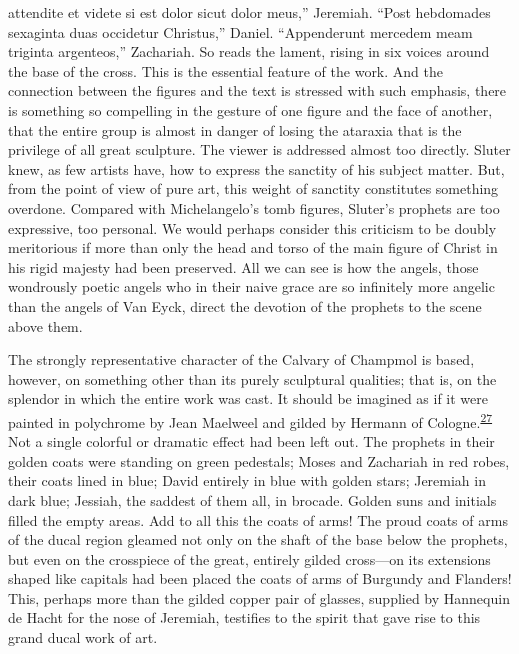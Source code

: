 attendite et videte si est dolor sicut dolor meus,'' Jeremiah. ``Post
hebdomades sexaginta duas occidetur Christus,'' Daniel. ``Appenderunt
mercedem meam triginta argenteos,'' Zachariah. So reads the lament,
rising in six voices around the base of the cross. This is the essential
feature of the work. And the connection between the figures and the text
is stressed with such emphasis, there is something so compelling in the
gesture of one figure and the face of another, that the entire group is
almost in danger of losing the ataraxia that is the privilege of all
great sculpture. The viewer is addressed almost too directly. Sluter
knew, as few artists have, how to express the sanctity of his subject
matter. But, from the point of view of pure art, this weight of sanctity
constitutes something overdone. Compared with Michelangelo's tomb
figures, Sluter's prophets are too expressive, too personal. We would
perhaps consider this criticism to be doubly meritorious if more than
only the head and torso of the main figure of Christ in his rigid
majesty had been preserved. All we can see is how the angels, those
wondrously poetic angels who in their naive grace are so infinitely more
angelic than the angels of Van Eyck, direct the devotion of the prophets
to the scene above them.

The strongly representative character of the Calvary of
Champ\protect\hypertarget{20_ILLUSTRATIONS_FOLLOW_PAGE.xhtmlux5cux23page_310}{}{}mol
is based, however, on something other than its purely sculptural
qualities; that is, on the splendor in which the entire work was cast.
It should be imagined as if it were painted in polychrome by Jean
Maelweel and gilded by Hermann of
Cologne.\textsuperscript{\protect\hypertarget{20_ILLUSTRATIONS_FOLLOW_PAGE.xhtmlux5cux23id_419}{\protect\hyperlink{23_NOTES.xhtmlux5cux23id_420}{27}}}
Not a single colorful or dramatic effect had been left out. The prophets
in their golden coats were standing on green pedestals; Moses and
Zachariah in red robes, their coats lined in blue; David entirely in
blue with golden stars; Jeremiah in dark blue; Jessiah, the saddest of
them all, in brocade. Golden suns and initials filled the empty areas.
Add to all this the coats of arms! The proud coats of arms of the ducal
region gleamed not only on the shaft of the base below the prophets, but
even on the crosspiece of the great, entirely gilded cross---on its
extensions shaped like capitals had been placed the coats of arms of
Burgundy and Flanders! This, perhaps more than the gilded copper pair of
glasses, supplied by Hannequin de Hacht for the nose of Jeremiah,
testifies to the spirit that gave rise to this grand ducal work of art.

